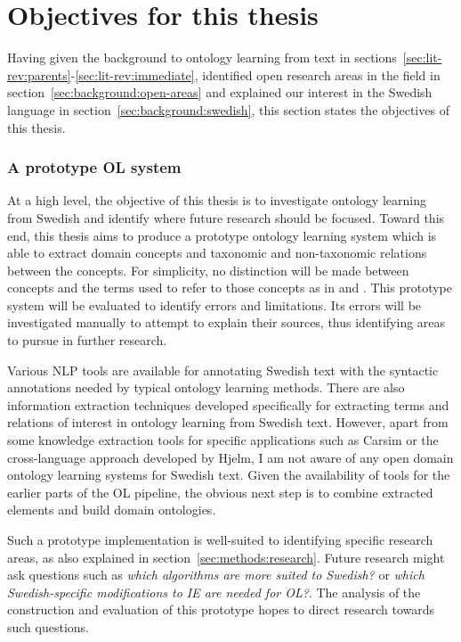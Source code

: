\documentclass[a4paper]{report}
\newcommand{\todo}[1]{}
\begin{document}
\section{Objectives for this thesis}
\label{sec:background:objectives}

Having given the background to ontology learning from text in sections~\ref{sec:lit-rev:parents}-\ref{sec:lit-rev:immediate}, identified open research areas in the field in section~\ref{sec:background:open-areas} and explained our interest in the Swedish language in section~\ref{sec:background:swedish}, this section states the objectives of this thesis.

\subsubsection{A prototype OL system}

At a high level, the objective of this thesis is to investigate ontology learning from Swedish and identify where future research should be focused.
Toward this end, this thesis aims to produce a prototype ontology learning system which is able to extract domain concepts and taxonomic and non-taxonomic relations between the concepts.
For simplicity, no distinction will be made between concepts and the terms used to refer to those concepts as in \cite{Hjelm09Thesis} and \cite{DellschaftStaab06HowGold}.
This prototype system will be evaluated to identify errors and limitations.
Its errors will be investigated manually to attempt to explain their sources, thus identifying areas to pursue in further research.

Various NLP tools are available for annotating Swedish text with the syntactic annotations needed by typical ontology learning methods.
There are also information extraction techniques developed specifically for extracting terms and relations of interest in ontology learning from Swedish text\cite{Kokkinakis08SolidComp}\todo{I can cite more here and mention more in lit review if necessary}.
However, apart from some knowledge extraction tools for specific applications such as Carsim\cite{JohanssonEtAll04Carsim} or the cross-language approach developed by Hjelm\cite{Hjelm09Thesis}, I am not aware of any open domain ontology learning systems for Swedish text.
Given the availability of tools for the earlier parts of the OL pipeline, the obvious next step is to combine extracted elements and build domain ontologies.

Such a prototype implementation is well-suited to identifying specific research areas, as also explained in section~\ref{sec:methods:research}.
Future research might ask questions such as \emph{which algorithms are more suited to Swedish?} or \emph{which Swedish-specific modifications to IE are needed for OL?}.
The analysis of the construction and evaluation of this prototype hopes to direct research towards such questions.
\end{document}
